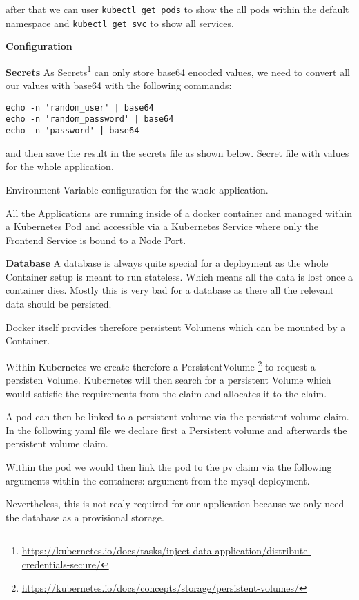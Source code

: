 after that we can user \texttt{kubectl get pods} to show the all pods within the default namespace and \texttt{kubectl get svc} to show all services.


\textbf{Configuration}

\textbf{Secrets}
As Secrets\footnote{\url{https://kubernetes.io/docs/tasks/inject-data-application/distribute-credentials-secure/}} can only store base64 encoded values, we need to convert all our values with base64 with the following commands:
\begin{verbatim}
echo -n 'random_user' | base64
echo -n 'random_password' | base64
echo -n 'password' | base64
\end{verbatim}
and then save the result in the secrets file as shown below.
Secret file with values for the whole application.


Environment Variable configuration for the whole application.


All the Applications are running inside of a docker container and managed within a Kubernetes Pod and accessible via a Kubernetes Service where only the Frontend Service is bound to a Node Port.

\textbf{Database}
A database is always quite special for a deployment as the whole Container setup is meant to run stateless. Which means all the data is lost once a container dies. Mostly this is very bad for a database as there all the relevant data should be persisted.

Docker itself provides therefore persistent Volumens which can be mounted by a Container.

Within Kubernetes we create therefore a PersistentVolume \footnote{\url{https://kubernetes.io/docs/concepts/storage/persistent-volumes/}} to request a persisten Volume. Kubernetes will then search for a persistent Volume which would satisfie the requirements from the claim and allocates it to the claim.

A pod can then be linked to a persistent volume via the persistent volume claim.
In the following yaml file we declare first a Persistent volume and afterwards the persistent volume claim.


Within the pod we would then link the pod to the pv claim via the following arguments within the containers: argument from the mysql deployment.

Nevertheless, this is not realy required for our application because we only need the database as a provisional storage.


